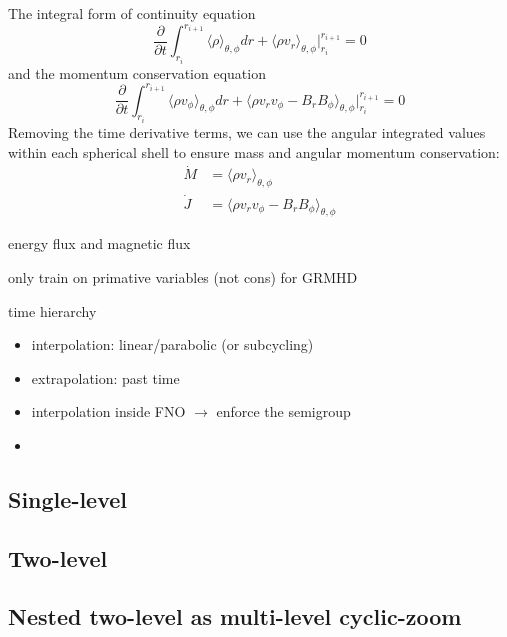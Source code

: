 \documentclass{article}
\begin{document}
The integral form of continuity equation
\begin{equation}
    \frac{\partial}{\partial t} \int_{r_i}^{r_{i+1}}\langle \rho \rangle_{\theta,\phi} dr + \langle \rho v_r\rangle_{\theta,\phi}|_{r_i}^{r_{i+1}}=0
\end{equation}
and the momentum conservation equation 
\begin{equation}
    \frac{\partial}{\partial t} \int_{r_i}^{r_{i+1}}\langle \rho v_\phi \rangle_{\theta,\phi} dr + \langle \rho v_r v_\phi - B_rB_\phi\rangle_{\theta,\phi}|_{r_i}^{r_{i+1}}=0
\end{equation}
Removing the time derivative terms, we can use the angular integrated values within each spherical shell to ensure mass and angular momentum conservation: 
\begin{align}
    \dot M & = \langle \rho v_r\rangle_{\theta,\phi} \\
    \dot J & = \langle \rho v_r v_\phi - B_rB_\phi\rangle_{\theta,\phi}
\end{align}

energy flux and magnetic flux 

only train on primative variables (not cons) for GRMHD

time hierarchy
\begin{itemize}
    \item interpolation: linear/parabolic (or subcycling)
    \item extrapolation: past time
    \item interpolation inside FNO $\to$ enforce the semigroup
    \item 
\end{itemize}


\subsection{Single-level}

\subsection{Two-level}

\subsection{Nested two-level as multi-level cyclic-zoom}

\end{document}
